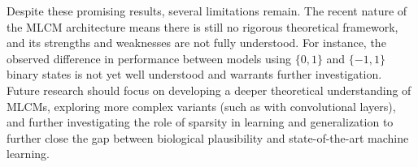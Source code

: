 \documentclass[a4paper,12pt]{report}
\begin{document}
Despite these promising results, several limitations remain. The recent nature of 
the MLCM architecture means there is still no rigorous theoretical framework, and 
its strengths and weaknesses are not fully understood. For instance, the observed difference in performance between models 
using \(\{0,1\}\) and \(\{-1,1\}\) binary states is not yet well understood and 
warrants further investigation. Future research should focus on developing a deeper 
theoretical understanding of MLCMs, exploring more complex variants 
(such as with convolutional layers), and further investigating the role of sparsity in 
learning and generalization to further close the gap between biological plausibility 
and state-of-the-art machine learning.





\appendix
\end{document}
